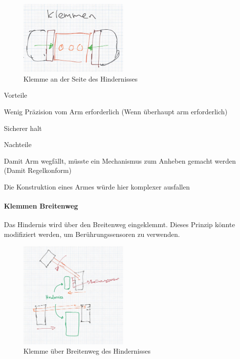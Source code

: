 \documentclass[../main.tex]{subfiles}
\begin{document}
\begin{figure}[h!]
        \centering
        \includegraphics[width=0.48\textwidth]{img/technologierecherche/Aufnahme/Laengsweg_Griff.jpg}
        \caption{Klemme an der Seite des Hindernisses}
        \label{img:tech_Laengsweg_Griff}
\end{figure}

\begin{minipage}[t]{0.48\textwidth}
    \begin{items}
          \item [Vorteile]
          \item Wenig Präzision vom Arm erforderlich (Wenn überhaupt arm erforderlich)
          \item Sicherer halt
    \end{items}
\end{minipage}
\hfill
\begin{minipage}[t]{0.48\textwidth}
    \begin{items}
          \item [Nachteile]
          \item Damit Arm wegfällt, müsste ein Mechanismus zum Anheben gemacht werden (Damit Regelkonform)
          \item Die Konstruktion eines Armes würde hier komplexer ausfallen 
    \end{items}
\end{minipage}
\newpage
\paragraph{Klemmen Breitenweg}
Das Hindernis wird über den Breitenweg eingeklemmt. Dieses Prinzip könnte modifiziert werden, um Berührungssensoren zu verwenden.

\begin{figure}[h]
        \centering
        \includegraphics[width=0.48\textwidth]{img/technologierecherche/Aufnahme/Breiterweg_Griff.jpg}
        \caption{Klemme über Breitenweg des Hindernisses}
        \label{img:tech_Breiterweg_Griff}
\end{figure}
\end{document}
